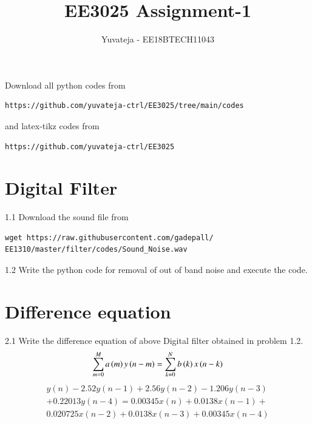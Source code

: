 \documentclass[journal,12pt,twocolumn]{IEEEtran}
\begin{document}
     \def\rightbox#1{\makebox[0in][r]{#1}}
     \def\centbox#1{\makebox[0in]{#1}}
     \def\topbox#1{\raisebox{-\baselineskip}[0in][0in]{#1}}
     \def\midbox#1{\raisebox{-0.5\baselineskip}[0in][0in]{#1}}
\vspace{3cm}
\title{EE3025 Assignment-1}
\author{Yuvateja - EE18BTECH11043}
\maketitle
\bigskip
\renewcommand{\thefigure}{\theenumi}
\renewcommand{\thetable}{\theenumi}
\bigskip
Download all python codes from 
\begin{lstlisting}
https://github.com/yuvateja-ctrl/EE3025/tree/main/codes
\end{lstlisting}



%
and latex-tikz codes from 
%
\begin{lstlisting}
https://github.com/yuvateja-ctrl/EE3025
\end{lstlisting}
\section{Digital Filter}
1.1 Download the sound file from  
\begin{lstlisting}
wget https://raw.githubusercontent.com/gadepall/ 
EE1310/master/filter/codes/Sound_Noise.wav
\end{lstlisting}
1.2 Write the python code for removal of out of band noise and execute the code.
\\
\solution

\section{Difference equation}
2.1 Write the difference equation of above Digital filter obtained in problem 1.2.
\\
\solution
\begin{equation}
\label{eq:iir_filter_gen}
 \sum _{m=0}^{M}a\brak{m}y\brak{n-m}=\sum _{k=0}^{N}b\brak{k}x\brak{n-k}
\end{equation}
\begin{equation}
\label{eq:diff_eqn}
\begin{split}
y(n) - 2.52y(n-1) + 2.56y(n-2) - 1.206y(n-3)
\\
+ 0.22013y(n-4) = 0.00345x(n) + 0.0138x(n-1) +
\\
 0.020725x(n-2) + 0.0138x(n-3) + 0.00345x(n-4)
\end{split}
\end{equation}
\end{document}
